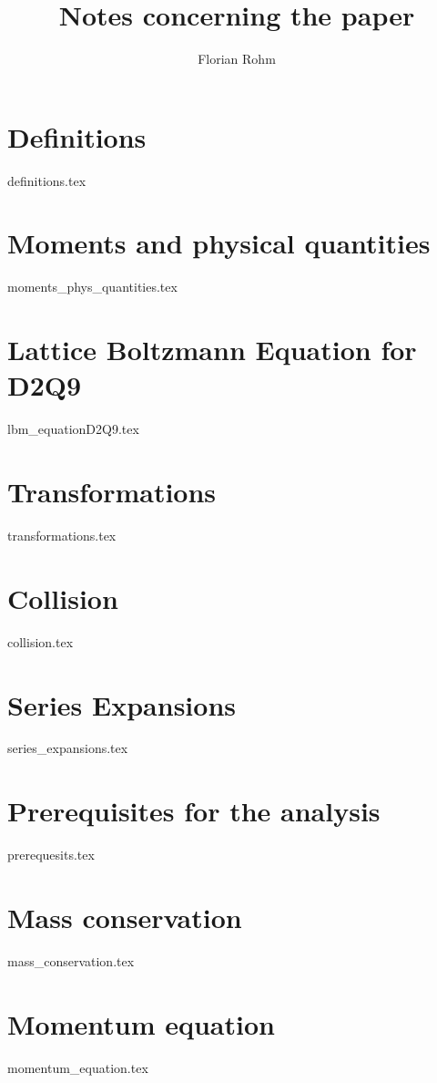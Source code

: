 \documentclass{article}
\title{Notes concerning the paper}
\author{Florian Rohm}
\begin{document}
\maketitle
\tableofcontents
\newpage
\listoftodos{}
\newpage

\section{Definitions}
\label{sec:Definitions}
{definitions.tex}

\section{Moments and physical quantities}
\label{sec:Moments and physical quantities}
{moments_phys_quantities.tex}

\section{Lattice Boltzmann Equation for D2Q9}
\label{sec:Lattice Boltzmann Equation for D2Q9}
{lbm_equationD2Q9.tex}

\section{Transformations}
\label{sec:Transformations}
{transformations.tex}

\section{Collision}
\label{sec:Collision}
{collision.tex}

\section{Series Expansions}
\label{sec:Series Expansions}
{series_expansions.tex}

\section{Prerequisites for the analysis}
\label{sec:Prerequisites for the analysis}
{prerequesits.tex}

\section{Mass conservation}
\label{sec:Mass conservation}
{mass_conservation.tex}

\section{Momentum equation}
\label{sec:Momentum equation}
{momentum_equation.tex}
\end{document}
